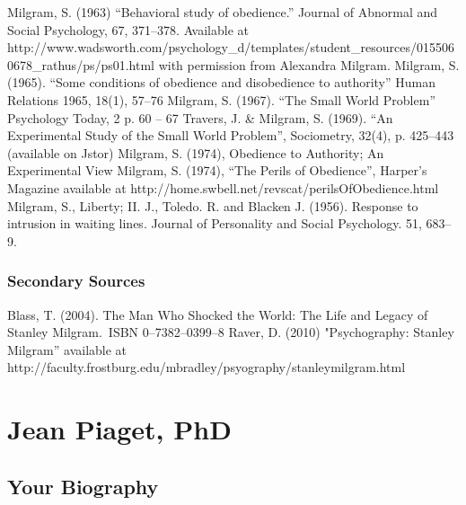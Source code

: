 Milgram, S. (1963) “Behavioral study of obedience.” Journal of Abnormal and Social Psychology, 67, 371–378. Available at http:\slash \slash www.wadsworth.com\slash psychology\_d\slash templates\slash student\_resources\slash 0155060678\_rathus\slash ps\slash ps01.html with permission from Alexandra Milgram.
Milgram, S. (1965). “Some conditions of obedience and disobedience to authority” Human Relations 1965, 18(1), 57--76
Milgram, S. (1967). ``The Small World Problem'' Psychology Today, 2 p. 60 – 67
Travers, J. \& Milgram, S. (1969). “An Experimental Study of the Small World Problem”, Sociometry, 32(4), p. 425--443 (available on Jstor)
Milgram, S. (1974), Obedience to Authority; An Experimental View
Milgram, S. (1974), ``The Perils of Obedience'', Harper's Magazine available at http:\slash \slash home.swbell.net\slash revscat\slash perilsOfObedience.html
Milgram, S., Liberty; II. J., Toledo. R. and Blacken J. (1956). Response to intrusion in waiting lines. Journal of Personality and Social Psychology. 51, 683--9.

\subsection{Secondary Sources}
\label{secondarysources}

Blass, T. (2004). The Man Who Shocked the World: The Life and Legacy of Stanley Milgram. ISBN 0--7382--0399--8
Raver, D. (2010) "Psychography: Stanley Milgram” available at http:\slash \slash faculty.frostburg.edu\slash mbradley\slash psyography\slash stanleymilgram.html

\chapter{Jean Piaget, PhD}
\label{jeanpiagetphd}

\section{Your Biography}
\label{yourbiography}

